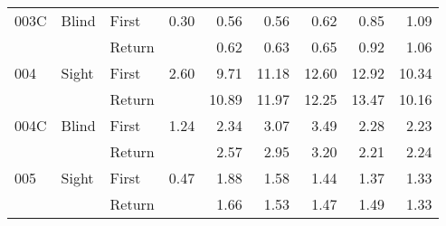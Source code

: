 \begin{table}[!htb]
\begin{tabular}{lllrrrrrr}
003C & Blind & First &     0.30 &   0.56 &   0.56 &                                                  0.62 &                                                   0.85 &    1.09 \\
    &       & Return &          &   0.62 &   0.63 &                                                  0.65 &                                                   0.92 &    1.06 \\
004 & Sight & First &     2.60 &   9.71 &  11.18 &                                                 12.60 &                                                  12.92 &   10.34 \\
    &       & Return &          &  10.89 &  11.97 &                                                 12.25 &                                                  13.47 &   10.16 \\
004C & Blind & First &     1.24 &   2.34 &   3.07 &                                                  3.49 &                                                   2.28 &    2.23 \\
    &       & Return &          &   2.57 &   2.95 &                                                  3.20 &                                                   2.21 &    2.24 \\
005 & Sight & First &     0.47 &   1.88 &   1.58 &                                                  1.44 &                                                   1.37 &    1.33 \\
    &       & Return &          &   1.66 &   1.53 &                                                  1.47 &                                                   1.49 &    1.33 \\
\bottomrule
\end{tabular}
\end{table}

